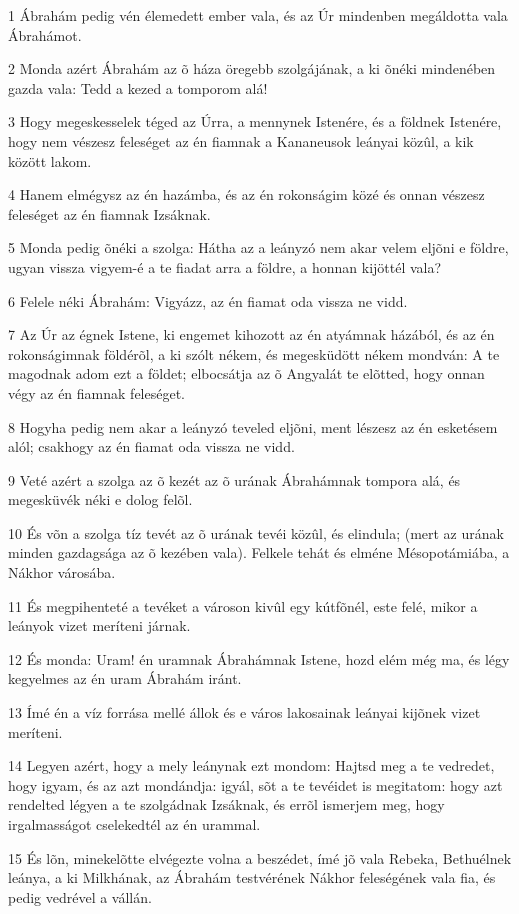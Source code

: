 \par 1 Ábrahám pedig vén élemedett ember vala, és az Úr mindenben megáldotta vala Ábrahámot.
\par 2 Monda azért Ábrahám az õ háza öregebb szolgájának, a ki õnéki mindenében gazda vala: Tedd a kezed a tomporom alá!
\par 3 Hogy megeskesselek téged az Úrra, a mennynek Istenére, és a földnek Istenére, hogy nem vészesz feleséget az én fiamnak a Kananeusok leányai közûl, a kik között lakom.
\par 4 Hanem elmégysz az én hazámba, és az én rokonságim közé és onnan vészesz feleséget az én fiamnak Izsáknak.
\par 5 Monda pedig õnéki a szolga: Hátha az a leányzó nem akar velem eljõni e földre, ugyan vissza vigyem-é a te fiadat arra a földre, a honnan kijöttél vala?
\par 6 Felele néki Ábrahám: Vigyázz, az én fiamat oda vissza ne vidd.
\par 7 Az Úr az égnek Istene, ki engemet kihozott az én atyámnak házából, és az én rokonságimnak földérõl, a ki szólt nékem, és megesküdött nékem mondván: A te magodnak adom ezt a földet; elbocsátja az õ Angyalát te elõtted, hogy onnan végy az én fiamnak feleséget.
\par 8 Hogyha pedig nem akar a leányzó teveled eljõni, ment lészesz az én esketésem alól; csakhogy az én fiamat oda vissza ne vidd.
\par 9 Veté azért a szolga az õ kezét az õ urának Ábrahámnak tompora alá, és megesküvék néki e dolog felõl.
\par 10 És võn a szolga tíz tevét az õ urának tevéi közûl, és elindula; (mert az urának minden gazdagsága az õ kezében vala). Felkele tehát és elméne Mésopotámiába, a Nákhor városába.
\par 11 És megpihenteté a tevéket a városon kivûl egy kútfõnél, este felé, mikor a leányok vizet meríteni járnak.
\par 12 És monda: Uram! én uramnak Ábrahámnak Istene, hozd elém még ma, és légy kegyelmes az én uram Ábrahám iránt.
\par 13 Ímé én a víz forrása mellé állok és e város lakosainak leányai kijõnek vizet meríteni.
\par 14 Legyen azért, hogy a mely leánynak ezt mondom: Hajtsd meg a te vedredet, hogy igyam, és az azt mondándja: igyál, sõt a te tevéidet is megitatom: hogy azt rendelted légyen a te szolgádnak Izsáknak, és errõl ismerjem meg, hogy irgalmasságot cselekedtél az én urammal.
\par 15 És lõn, minekelõtte elvégezte volna a beszédet, ímé jõ vala Rebeka, Bethuélnek leánya, a ki Milkhának, az Ábrahám testvérének Nákhor feleségének vala fia, és pedig vedrével a vállán.
